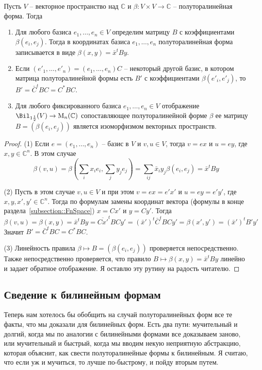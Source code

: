 \begin{claim}
Пусть $V$ -- векторное пространство над $\mathbb C$ и $\beta \colon V\times V \to \mathbb C$ -- полуторалинейная форма.
Тогда
\begin{enumerate}
\item Для любого базиса $e_1,\ldots,e_n\in V$ определим матрицу $B$ с коэффициентами $\beta(e_i, e_j)$.
Тогда в координатах базиса $e_1,\ldots,e_n$ полуторалинейная форма записывается в виде $\beta(x, y) = \bar x^t B y$.

\item Если $(e'_1,\ldots,e'_n) = (e_1,\ldots,e_n)C$ -- некоторый другой базис, в котором матрица полуторалинейной формы есть $B'$ с коэффициентами $\beta(e'_i,e'_j)$, то $B' = \bar C^t B C = C^* B C$.

\item Для любого фиксированного базиса $e_1,\ldots,e_n\in V$ отображение $\Bil_{1\frac{1}{2}}(V)\to \operatorname{M}_n(\mathbb C)$ сопоставляющее полуторалинейной форме $\beta$ ее матрицу $B = (\beta(e_i,e_j))$ является изоморфизмом векторных пространств.
\end{enumerate}
\end{claim}
\begin{proof}
(1) Если $e = (e_1,\ldots,e_n)$ -- базис в $V$ и $v,u\in V$, тогда $v = ex$ и $u = ey$, где $x,y\in \mathbb C^n$.
В этом случае
\[
\beta(v,u) = \beta(\sum_i x_i e_i, \sum_j y_j e_j) = \sum_{ij}\bar x_i y_j \beta(e_i, e_j) = \bar x^t B y
\]

(2) Пусть в этом случае $v,u\in V$ и при этом $v = ex = e' x'$ и $u = ey = e'y'$, где $x,y,x',y'\in \mathbb C^n$.
Тогда по формулам замены координат вектора (формулы в конце раздела~\ref{subsection::FnSpace}) $x = Cx'$ и $y = Cy'$.
Тогда
\[
\beta(v,u) =\beta(x,y) = \bar x^t B y = \overline{Cx'}^t B C y' = (\bar x')^t \bar C^t B C y' = \beta(x',y') = (\bar x')^t B' y'
\]
Значит $B' = \bar C^t B C = C^* B C$.

(3) Линейность правила $\beta\mapsto B = (\beta(e_i, e_j))$ проверяется непосредственно.
Также непосредственно проверяется, что правило $B\mapsto \beta(x,y) = \bar x^t B y$ линейно и задает обратное отображение.
Я оставлю эту рутину на радость читателю.
\end{proof}


\subsection{Сведение к билинейным формам}
Теперь нам хотелось бы обобщить на случай полуторалинейных форм все те факты, что мы доказали для билинейных форм.
Есть два пути: мучительный и долгий, когда мы по аналогии с билинейными формами все доказываем заново, или мучительный и быстрый, когда мы вводим некую неприятную абстракцию, которая объяснит, как свести полуторалинейные формы к билинейным.
Я считаю, что если уж и мучиться, то лучше по-быстрому, и пойду вторым путем.

